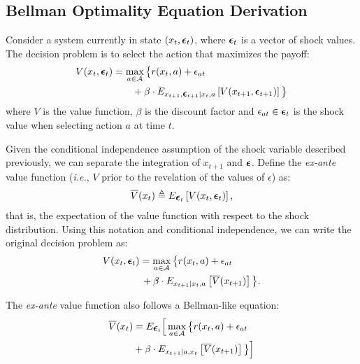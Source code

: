 \documentclass{article}
\renewcommand{\vec}[1]{\mbox{\bm{$#1$}}}
\begin{document}
\subsection{Bellman Optimality Equation Derivation}

Consider a system currently in state $(x_t,\vec{\epsilon}_t)$, where $\vec{\epsilon}_t$ is a vector of shock values. The decision problem is to select the action that maximizes the payoff:
\begin{align}
\begin{split}
V(x_t,\vec{\epsilon}_t) & = \max_{a\in\mathcal{A}} \big\{r(x_t,a)+\epsilon_{at} \\
& \qquad + \beta \cdot E_{x_{t+1},\vec{\epsilon}_{t+1}|x_t,a} \left[V(x_{t+1},\vec{\epsilon}_{t+1})\right] \big\} \\
\end{split}
\end{align} 
where $V$ is the value function, $\beta$ is the discount factor and $\epsilon_{at} \in \vec{\epsilon}_t$ is the shock value when selecting action $a$ at time $t$.


Given the conditional independence assumption of the shock variable described previously, we can separate the integration of $x_{t+1}$ and $\vec{\epsilon}$. Define the \emph{ex-ante} value function (\emph{i.e.}, $V$ prior to the revelation of the values of $\epsilon$) as:
\begin{eqnarray}\label{eq:def_exante}
\overline{V}(x_t)
\triangleq 
E_{\vec{\epsilon}_t} \left[ V(x_t, \vec{\epsilon}_t) \right],
\end{eqnarray}
that is, the expectation of the value function with respect to the shock distribution. Using this notation and conditional independence, we can write the original decision problem as:
%
\begin{align}
\begin{split}
V(x_t,\vec{\epsilon}_t) & =\max_{a\in\mathcal{A}} \big\{ \vphantom{V} r(x_t,a)+\epsilon_{at}  \\
&  \, +\beta \cdot E_{x_{t+1}|x_t,a} \left[ \overline{V}(x_{t+1}) \right] \vphantom{r(x_t, a)} \big\}.
\nonumber
\end{split}
\end{align}


The \emph{ex-ante} value function also follows a Bellman-like equation:
\begin{align} \label{eq:exantebellman}
\begin{split}
\overline{V}(x_t) & = E_{\vec{\epsilon}_t}\Big[\max_{a\in\mathcal{A}} \big\{r(x_t,a)+\epsilon_{at} \\
& +\beta  \cdot E_{x_{t+1}|a,x_t} \left[ \overline{V}(x_{t+1}) \right] \big\}\Big]
\end{split}
\end{align}
\end{document}
